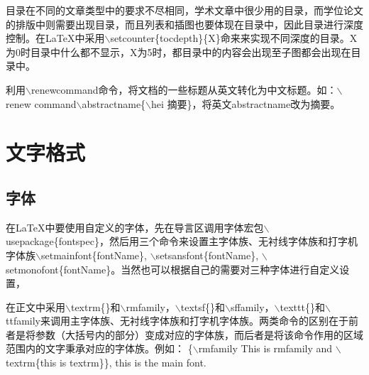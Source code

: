 \documentclass[12pt]{book}
\begin{document}
目录在不同的文章类型中的要求不尽相同，学术文章中很少用的目录，而学位论文的排版中则需要出现目录，而且列表和插图也要体现在目录中，因此目录进行深度控制。在\LaTeX{}中采用$\backslash$setcounter\{tocdepth\}\{X\}命来来实现不同深度的目录。X为0时目录中什么都不显示，X为5时，都目录中的内容会出现至子图都会出现在目录中。

利用$\backslash$renewcommand命令，将文档的一些标题从英文转化为中文标题。如：$\backslash$renew command$\backslash$abstractname\{$\backslash$hei 摘要\}，将英文abstractname改为摘要。

%


\section{文字格式}

\subsection{字体}

在LaTeX中要使用自定义的字体，先在导言区调用字体宏包$\backslash$usepackage\{fontspec\}，然后用三个命令来设置主字体族、无衬线字体族和打字机字体族$\backslash$setmainfont\{fontName\}, $\backslash$setsansfont\{fontName\}, $\backslash$setmonofont\{fontName\}。当然也可以根据自己的需要对三种字体进行自定义设置，


在正文中采用$\backslash$textrm\{\}和$\backslash$rmfamily，$\backslash$textsf\{\}和$\backslash$sffamily，$\backslash$texttt\{\}和$\backslash$ttfamily来调用主字体族、无衬线字体族和打字机字体族。两类命令的区别在于前者是将参数（大括号内的部分）变成对应的字体族，而后者是将该命令作用的区域范围内的文字秉承对应的字体族。例如：
\{$\backslash$rmfamily This is rmfamily and $\backslash$textrm\{this is textrm\}\}, this is the main font.
\end{document}
